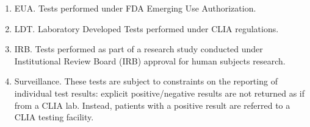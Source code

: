 \begin{enumerate}
    \item EUA. Tests performed under FDA Emerging Use Authorization.
    \item LDT. Laboratory Developed Tests performed under CLIA regulations.
    \item IRB. Tests performed as part of a research study conducted under Institutional Review Board (IRB) approval for human subjects research.
    \item Surveillance. These tests are subject to constraints on the reporting of individual test results: explicit positive/negative results are not returned as if from a CLIA lab. Instead, patients with a positive result are referred to a CLIA testing facility.
\end{enumerate}